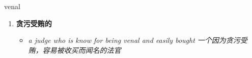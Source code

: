 
\begin{frame}
{\huge venal}
\begin{center}
\begin{enumerate}\Large
  \item \textbf{贪污受贿的}
  \begin{itemize}
    \item \em{\Large{a judge who is know for being venal and easily bought 一个因为贪污受贿，容易被收买而闻名的法官}}
  \end{itemize}
\end{enumerate}
\end{center}
\end{frame}
